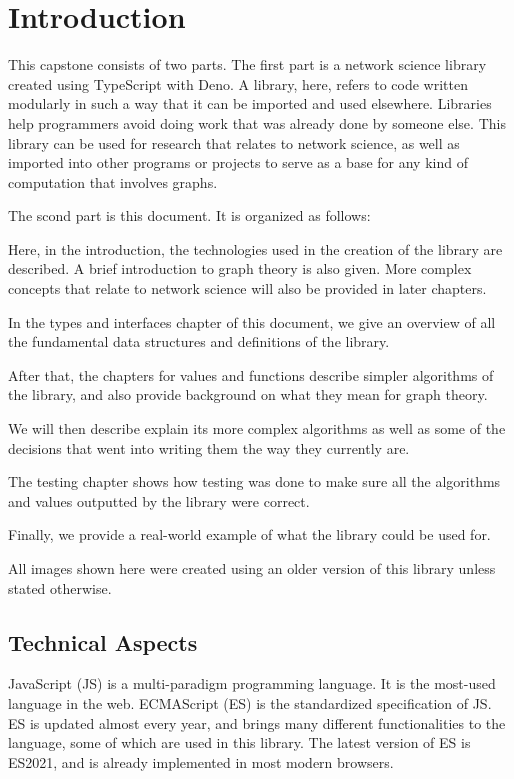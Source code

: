 \section{Introduction}

This capstone consists of two parts.
The first part is a network science library created using TypeScript with Deno.
A library, here, refers to code written modularly in such a way that it can be imported and used elsewhere.
Libraries help programmers avoid doing work that was already done by someone else.
This library can be used for research that relates to network science,
as well as imported into other programs or projects to serve as a base for any
kind of computation that involves graphs.

The scond part is this document. It is organized as follows:


Here, in the introduction, the technologies used in the creation of the library are described.
A brief introduction to graph theory is also given.
More complex concepts that relate to network science will also be provided in later chapters.

In the types and interfaces chapter of this document, we give an overview of all the fundamental
data structures and definitions of the library.

After that, the chapters for values and functions describe simpler algorithms
of the library, and also provide background on what they mean for graph theory.

We will then describe explain its more complex algorithms as well as some of the
decisions that went into writing them the way they currently are.

The testing chapter shows how testing was done to make sure all the algorithms and values outputted by the library were correct.

Finally, we provide a real-world example of what the library could be used for.

All images shown here were created using an older version of this library unless stated otherwise.

\subsection{Technical Aspects}

JavaScript (JS) is a multi-paradigm programming language.
It is the most-used language in the web.
ECMAScript (ES) is the standardized specification of JS.
ES is updated almost every year, and brings many different functionalities to the language, some of which are used in this library.
The latest version of ES is ES2021, and is already implemented in most modern browsers.

